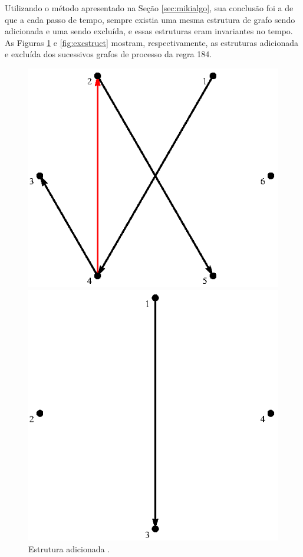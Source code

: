 \documentclass[12pt,a4paper]{article}
\begin{document}
Utilizando o método apresentado na Seção \ref{sec:mikialgo}, sua conclusão
foi a de que a cada passo de tempo, sempre existia uma mesma estrutura
de grafo sendo adicionada e uma sendo excluída, e essas estruturas eram
invariantes no tempo. As Figuras \ref{fig:addstruct} e \ref{fig:excstruct}
mostram, respectivamente, as estruturas adicionada e excluída dos sucessivos
grafos de processo da regra 184.

\begin{figure}[htp]
\begin{minipage}[b]{0.5\linewidth}
\centering
\includegraphics[scale=1]{img/addStruct.eps}
\caption{Estrutura adicionada .}
\label{fig:addstruct}
\end{minipage}
\hspace{0.5cm}
\begin{minipage}[b]{0.5\linewidth}
\centering
\includegraphics[scale=1]{img/excStruct.eps}

\end{minipage}
\end{figure}
\end{document}
